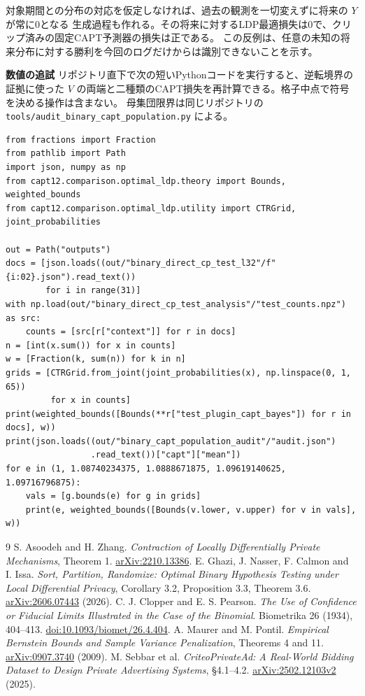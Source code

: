 \documentclass[a4paper,11pt]{ltjsarticle}
\theoremstyle{jp}
\newcommand{\para}[1]{\par\Needspace{3\baselineskip}\addvspace{.6\baselineskip}\noindent\textbf{#1}\enspace}
\begin{document}
対象期間との分布の対応を仮定しなければ、過去の観測を一切変えずに将来の \(Y\) が常に0となる
生成過程も作れる。その将来に対するLDP最適損失は0で、クリップ済みの固定CAPT予測器の損失は正である。
この反例は、任意の未知の将来分布に対する勝利を今回のログだけからは識別できないことを示す。

\clearpage
\para{数値の追試}
リポジトリ直下で次の短いPythonコードを実行すると、逆転境界の証拠に使った
\(V\) の両端と二種類のCAPT損失を再計算できる。格子中点で符号を決める操作は含まない。
母集団限界は同じリポジトリの \texttt{tools/audit\_binary\_capt\_population.py} による。
{\footnotesize
\begin{verbatim}
from fractions import Fraction
from pathlib import Path
import json, numpy as np
from capt12.comparison.optimal_ldp.theory import Bounds, weighted_bounds
from capt12.comparison.optimal_ldp.utility import CTRGrid, joint_probabilities

out = Path("outputs")
docs = [json.loads((out/"binary_direct_cp_test_l32"/f"{i:02}.json").read_text())
        for i in range(31)]
with np.load(out/"binary_direct_cp_test_analysis"/"test_counts.npz") as src:
    counts = [src[r["context"]] for r in docs]
n = [int(x.sum()) for x in counts]
w = [Fraction(k, sum(n)) for k in n]
grids = [CTRGrid.from_joint(joint_probabilities(x), np.linspace(0, 1, 65))
         for x in counts]
print(weighted_bounds([Bounds(**r["test_plugin_capt_bayes"]) for r in docs], w))
print(json.loads((out/"binary_capt_population_audit"/"audit.json")
                 .read_text())["capt"]["mean"])
for e in (1, 1.08740234375, 1.0888671875, 1.09619140625, 1.09716796875):
    vals = [g.bounds(e) for g in grids]
    print(e, weighted_bounds([Bounds(v.lower, v.upper) for v in vals], w))
\end{verbatim}
}

\begin{thebibliography}{9}\small\setlength{\itemsep}{2pt}
 S. Asoodeh and H. Zhang.
\emph{Contraction of Locally Differentially Private Mechanisms}, Theorem 1.
\href{https://arxiv.org/abs/2210.13386}{arXiv:2210.13386}.
 E. Ghazi, J. Nasser, F. Calmon and I. Issa.
\emph{Sort, Partition, Randomize: Optimal Binary Hypothesis Testing under Local Differential Privacy},
Corollary 3.2, Proposition 3.3, Theorem 3.6.
\href{https://arxiv.org/abs/2606.07443}{arXiv:2606.07443} (2026).
 C. J. Clopper and E. S. Pearson.
\emph{The Use of Confidence or Fiducial Limits Illustrated in the Case of the Binomial}.
Biometrika 26 (1934), 404--413.
\href{https://doi.org/10.1093/biomet/26.4.404}{doi:10.1093/biomet/26.4.404}.
 A. Maurer and M. Pontil.
\emph{Empirical Bernstein Bounds and Sample Variance Penalization}, Theorems 4 and 11.
\href{https://arxiv.org/abs/0907.3740}{arXiv:0907.3740} (2009).
 M. Sebbar et al.
\emph{CriteoPrivateAd: A Real-World Bidding Dataset to Design Private Advertising Systems},
\S4.1--4.2. \href{https://arxiv.org/html/2502.12103v2}{arXiv:2502.12103v2} (2025).
\end{thebibliography}
\end{document}
